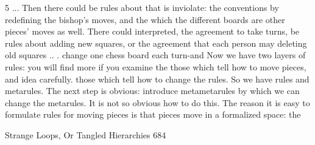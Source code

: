 5 ... Then there could be rules about          that is inviolate: the conventions by
redefining the bishop's moves, and the         which the different boards are
other pieces' moves as well. There could       interpreted, the agreement to take turns,
be rules about adding new squares, or          the agreement that each person may
deleting old squares .. .                      change one chess board each turn-and
        Now we have two layers of rules:       you will find more if you examine the
those which tell how to move pieces, and       idea carefully.
those which tell how to change the rules.
So we have rules and metarules. The
next step is obvious: introduce
metametarules by which we can change
the metarules. It is not so obvious how to
do this. The reason it is easy to
formulate rules for moving pieces is that
pieces move in a formalized space: the

Strange Loops, Or Tangled Hierarchies                                                 684

